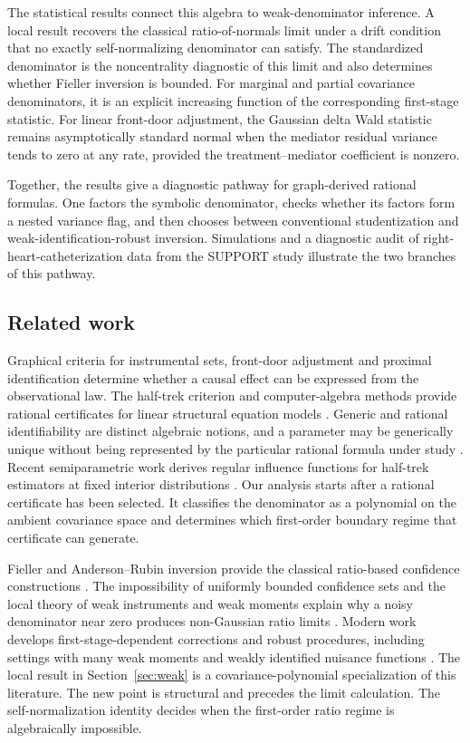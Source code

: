 \documentclass[12pt,a4paper]{article}
\theoremstyle{plain}
\theoremstyle{definition}
\begin{document}
The statistical results connect this algebra to weak-denominator inference.
A local result recovers the classical ratio-of-normals limit under a drift condition that no exactly self-normalizing denominator can satisfy.
The standardized denominator is the noncentrality diagnostic of this limit and also determines whether Fieller inversion is bounded.
For marginal and partial covariance denominators, it is an explicit increasing function of the corresponding first-stage statistic.
For linear front-door adjustment, the Gaussian delta Wald statistic remains asymptotically standard normal when the mediator residual variance tends to zero at any rate, provided the treatment--mediator coefficient is nonzero.

Together, the results give a diagnostic pathway for graph-derived rational formulas.
One factors the symbolic denominator, checks whether its factors form a nested variance flag, and then chooses between conventional studentization and weak-identification-robust inversion.
Simulations and a diagnostic audit of right-heart-catheterization data from the SUPPORT study illustrate the two branches of this pathway.

\subsection{Related work}

Graphical criteria for instrumental sets, front-door adjustment and proximal identification determine whether a causal effect can be expressed from the observational law.
The half-trek criterion and computer-algebra methods provide rational certificates for linear structural equation models \citep{pearl1995,britopearl2002,gpss2010,fdd2012,kurokipearl2014,vanderzander2015,miao2018,henckel2024,tchetgen2024}.
Generic and rational identifiability are distinct algebraic notions, and a parameter may be generically unique without being represented by the particular rational formula under study \citep{drtonweihs2016}.
Recent semiparametric work derives regular influence functions for half-trek estimators at fixed interior distributions \citep{mareis2026}.
Our analysis starts after a rational certificate has been selected.
It classifies the denominator as a polynomial on the ambient covariance space and determines which first-order boundary regime that certificate can generate.

Fieller and Anderson--Rubin inversion provide the classical ratio-based confidence constructions \citep{andersonrubin1949,fieller1954}.
The impossibility of uniformly bounded confidence sets and the local theory of weak instruments and weak moments explain why a noisy denominator near zero produces non-Gaussian ratio limits \citep{gleserhwang1987,dufour1997,staiger1997,stockwright2000,andrewscheng2012}.
Modern work develops first-stage-dependent corrections and robust procedures, including settings with many weak moments and weakly identified nuisance functions \citep{andrewsstocksun2019,lee2022,wang2025,bennett2026}.
The local result in Section~\ref{sec:weak} is a covariance-polynomial specialization of this literature.
The new point is structural and precedes the limit calculation.
The self-normalization identity decides when the first-order ratio regime is algebraically impossible.
\end{document}
